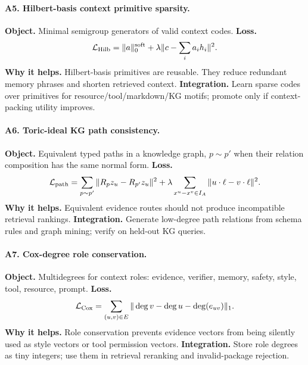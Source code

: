\documentclass[11pt]{article}
\newcommand{\loss}{\mathcal{L}}
\numberwithin{equation}{section}
\begin{document}
\paragraph{A5. Hilbert-basis context primitive sparsity.}
\textbf{Object.} Minimal semigroup generators of valid context codes. \textbf{Loss.}
\begin{equation}
\loss_{\rm Hilb}=\|a\|_0^{\rm soft}+\lambda\|c-\sum_i a_i h_i\|^2.
\end{equation}
\textbf{Why it helps.} Hilbert-basis primitives are reusable. They reduce redundant memory phrases and shorten retrieved context. \textbf{Integration.} Learn sparse codes over primitives for resource/tool/markdown/KG motifs; promote only if context-packing utility improves.

\paragraph{A6. Toric-ideal KG path consistency.}
\textbf{Object.} Equivalent typed paths in a knowledge graph, $p\sim p'$ when their relation composition has the same normal form. \textbf{Loss.}
\begin{equation}
\loss_{\rm path}=\sum_{p\sim p'}\|R_p z_u-R_{p'}z_u\|^2+\lambda\sum_{x^u-x^v\in I_A}\|u\cdot\ell-v\cdot\ell\|^2.
\end{equation}
\textbf{Why it helps.} Equivalent evidence routes should not produce incompatible retrieval rankings. \textbf{Integration.} Generate low-degree path relations from schema rules and graph mining; verify on held-out KG queries.

\paragraph{A7. Cox-degree role conservation.}
\textbf{Object.} Multidegrees for context roles: evidence, verifier, memory, safety, style, tool, resource, prompt. \textbf{Loss.}
\begin{equation}
\loss_{\rm Cox}=\sum_{(u,v)\in E}\|\deg v-\deg u-\deg(e_{uv})\|_1.
\end{equation}
\textbf{Why it helps.} Role conservation prevents evidence vectors from being silently used as style vectors or tool permission vectors. \textbf{Integration.} Store role degrees as tiny integers; use them in retrieval reranking and invalid-package rejection.
\end{document}
